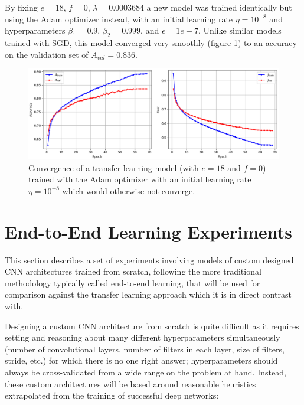 By fixing $e = 18$, $f = 0$, $\lambda = 0.0003684$ a new model was trained identically but using the Adam optimizer instead, with an initial learning rate $\eta = 10^{-8}$ and hyperparameters $\beta_1=0.9$, $\beta_2=0.999$, and $\epsilon=1e-{7}$. Unlike similar models trained with \ac{SGD}, this model converged very smoothly (figure \ref{fig:vgg16_adam}) to an accuracy on the validation set of $A_{val} = 0.836$.

\begin{figure}[ht]
    \centering
    \includegraphics[width=1.0\textwidth]{figs/vgg16_adam.png}
    \caption{Convergence of a transfer learning model (with $e = 18$ and $f = 0$) trained with the Adam optimizer with an initial learning rate $\eta = 10^{-8}$ which would otherwise not converge.}
    \label{fig:vgg16_adam}
\end{figure}

\section{End-to-End Learning Experiments}
\label{section:endtoend}

This section describes a set of experiments involving models of custom designed \ac{CNN} architectures trained from scratch, following the more traditional methodology typically called end-to-end learning, that will be used for comparison against the transfer learning approach which it is in direct contrast with.

Designing a custom \ac{CNN} architecture from scratch is quite difficult as it requires setting and reasoning about many different hyperparameters simultaneously (number of convolutional layers, number of filters in each layer, size of filters, stride, etc.) for which there is no one right answer; hyperparameters should always be cross-validated from a wide range on the problem at hand. Instead, these custom architectures will be based around reasonable heuristics \cite{cs231n} extrapolated from the training of successful deep networks:

